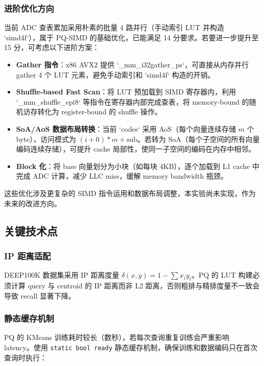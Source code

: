 \documentclass[a4paper]{article}
\begin{document}
\subsubsection{进阶优化方向}

当前 ADC 查表累加采用朴素的批量 4 路并行（手动索引 LUT 并构造 `simd4f`），属于 PQ-SIMD 的基础优化，已能满足 14 分要求。若要进一步提升至 15 分，可考虑以下进阶方案：

\begin{itemize}
  \item \textbf{Gather 指令}：x86 AVX2 提供 `_mm_i32gather_ps`，可直接从内存并行 gather 4 个 LUT 元素，避免手动索引和 `simd4f` 构造的开销。
  \item \textbf{Shuffle-based Fast Scan}：将 LUT 预加载到 SIMD 寄存器内，利用 `_mm_shuffle_epi8` 等指令在寄存器内部完成查表，将 memory-bound 的随机访存转化为 register-bound 的 shuffle 操作。
  \item \textbf{SoA/AoS 数据布局转换}：当前 `codes` 采用 AoS（每个向量连续存储 $m$ 个 byte），访问模式为 $(i+0)*m+\text{sub}$。若转为 SoA（每个子空间的所有向量编码连续存储），可提升 cache 局部性，使同一子空间的编码在内存中相邻。
  \item \textbf{Block 化}：将 base 向量划分为小块（如每块 4KB），逐个加载到 L1 cache 中完成 ADC 计算，减少 LLC miss，缓解 memory bandwidth 瓶颈。
\end{itemize}

这些优化涉及更复杂的 SIMD 指令运用和数据布局调整，本实验尚未实现，作为未来的改进方向。

\subsection{关键技术点}

\subsubsection{IP 距离适配}

DEEP100K 数据集采用 IP 距离度量 $\delta(x,y) = 1 - \sum x_i y_i$。PQ 的 LUT 构建必须计算 query 与 centroid 的 IP 距离而非 L2 距离，否则粗排与精排度量不一致会导致 recall 显著下降。

\subsubsection{静态缓存机制}

PQ 的 KMeans 训练耗时较长（数秒），若每次查询重复训练会严重影响 latency。使用 \texttt{static bool ready} 静态缓存机制，确保训练和数据编码只在首次查询时执行：
\end{document}
